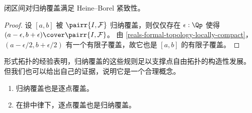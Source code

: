 \begin{cor} \label{interval-Heine-Borel}
  闭区间对归纳覆盖满足 Heine--Borel 紧致性。
\end{cor}

\begin{proof}
  设 $[a, b]$ 被 $\pairr{I, \mathcal{F}}$ 归纳覆盖，则仅仅存在
  $\epsilon : \Qp$ 使得 $(a - \epsilon, b + \epsilon) \cover \pairr{I, \mathcal{F}}$。
  由 \cref{reals-formal-topology-locally-compact}，$(a - \epsilon/2, b + \epsilon/2)$ 有一个有限子覆盖，故它也是 $[a, b]$ 的有限子覆盖。
\end{proof}

形式拓扑的经验表明，归纳覆盖的这些规则足以支撑点自由拓扑的构造性发展。
但我们也可以给出自己的证据，说明它是一个合理概念。

\begin{thm} \label{inductive-cover-classical}
  \mbox{}
  \begin{enumerate}
  \item 归纳覆盖也是逐点覆盖。
  \item 在排中律下，逐点覆盖也是归纳覆盖。
  \end{enumerate}
\end{thm}

